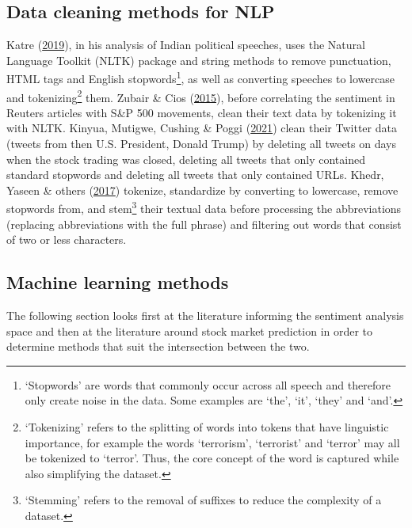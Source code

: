 \documentclass[11pt,preprint, authoryear]{elsarticle}
\numberwithin{equation}{section}
\numberwithin{figure}{section}
\numberwithin{table}{section}
\let\rmarkdownfootnote\footnote%
\def\footnote{\protect\rmarkdownfootnote}
\begin{document}
\hypertarget{data-cleaning-methods-for-nlp}{%
\subsection{\texorpdfstring{Data cleaning methods for NLP
\label{data cleaning}}{Data cleaning methods for NLP }}\label{data-cleaning-methods-for-nlp}}

Katre (\protect\hyperlink{ref-katre2019nlp}{2019}), in his analysis of
Indian political speeches, uses the Natural Language Toolkit (NLTK)
package and string methods to remove punctuation, HTML tags and English
stopwords\footnote{`Stopwords' are words that commonly occur across all
  speech and therefore only create noise in the data. Some examples are
  `the', `it', `they' and `and'.}, as well as converting speeches to
lowercase and tokenizing\footnote{`Tokenizing' refers to the splitting
  of words into tokens that have linguistic importance, for example the
  words `terrorism', `terrorist' and `terror' may all be tokenized to
  `terror'. Thus, the core concept of the word is captured while also
  simplifying the dataset.} them. Zubair \& Cios
(\protect\hyperlink{ref-zubair2015extracting}{2015}), before correlating
the sentiment in Reuters articles with S\&P 500 movements, clean their
text data by tokenizing it with NLTK. Kinyua, Mutigwe, Cushing \& Poggi
(\protect\hyperlink{ref-kinyua2021analysis}{2021}) clean their Twitter
data (tweets from then U.S. President, Donald Trump) by deleting all
tweets on days when the stock trading was closed, deleting all tweets
that only contained standard stopwords and deleting all tweets that only
contained URLs. Khedr, Yaseen \& others
(\protect\hyperlink{ref-khedr2017predicting}{2017}) tokenize,
standardize by converting to lowercase, remove stopwords from, and
stem\footnote{`Stemming' refers to the removal of suffixes to reduce the
  complexity of a dataset.} their textual data before processing the
abbreviations (replacing abbreviations with the full phrase) and
filtering out words that consist of two or less characters.

\hypertarget{machine-learning-methods}{%
\subsection{\texorpdfstring{Machine learning methods
\label{ML}}{Machine learning methods }}\label{machine-learning-methods}}

The following section looks first at the literature informing the
sentiment analysis space and then at the literature around stock market
prediction in order to determine methods that suit the intersection
between the two.
\end{document}
